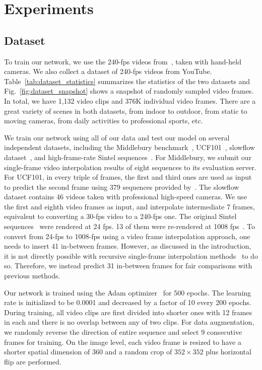 \documentclass[10pt,twocolumn,letterpaper]{article}
\makeatletter
\def\fps{-fps\@\xspace}
\makeatother
\begin{document}
\section{Experiments}

\subsection{Dataset} 
To train our network, we use the 240\fps videos from~\cite{su16deep}, taken with hand-held cameras. We also collect a dataset of 240\fps videos from YouTube. Table~\ref{tab:dataset_statistics} summarizes the statistics of the two datasets and Fig.~\ref{fig:dataset_snapshot} shows a snapshot of randomly sampled video frames. In total, we have 1,132 video clips and 376K individual video frames. There are a great variety of scenes in both datasets, from indoor to outdoor, from static to moving cameras, from daily activities to professional sports, etc. 

We train our network using all of our data and test our model on several independent datasets, including the Middlebury benchmark~\cite{baker11a}, UCF101~\cite{ucf101}, slowflow dataset~\cite{Janai2017CVPR}, and high-frame-rate Sintel sequences~\cite{Janai2017CVPR}. For Middlebury, we submit our single-frame video interpolation results of eight sequences to its evaluation server. For UCF101, in every triple of frames, the first and third ones are used as input to predict the second frame using 379 sequences provided by~\cite{liu17video}. The slowflow dataset contains 46 videos taken with professional high-speed cameras. We use the first and eighth video frames as input, and interpolate intermediate 7 frames, equivalent to converting a 30\fps video to a 240\fps one. The original Sintel sequences~\cite{Butler:ECCV:2012} were rendered at 24 fps. 13 of them were re-rendered at 1008 fps~\cite{Janai2017CVPR}. To convert from 24\fps to 1008\fps using a video frame interpolation approach, one needs to insert 41 in-between frames. However, as discussed in the introduction, it is not directly possible with recursive single-frame interpolation methods~\cite{niklaus17video_cvpr,niklaus17video_iccv,liu17video} to do so. Therefore, we instead predict 31 in-between frames for fair comparisons with previous methods.

Our network is trained using the Adam optimizer~\cite{kingma2014adam} for 500 epochs. The learning rate is initialized to be 0.0001 and  decreased by a factor of 10 every 200 epochs. During training, all video clips are first divided into shorter ones with 12 frames in each and there is no overlap between any of two clips. For data augmentation, we randomly reverse the direction of entire sequence and select 9 consecutive frames for training. On the image level, each video frame is resized to have a shorter spatial dimension of 360 and a random crop of $352\times 352$ plus horizontal flip are performed.
\end{document}
